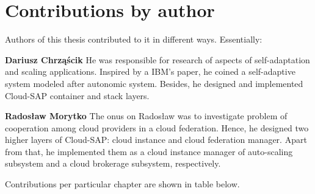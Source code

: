 \chapter{Contributions by author} 

Authors of this thesis contributed to it in different ways. Essentially: 

\begin{asparaenum}
 
 \item[\textbf{Dariusz Chrząścik}] He was responsible for research of aspects of self-adaptation and scaling applications. Inspired by a IBM's paper, he coined a self-adaptive system modeled after autonomic system. Besides, he designed and implemented Cloud-SAP container and stack layers.
 
 \item[\textbf{Radosław Morytko}] The onus on Radosław was to investigate problem of cooperation among cloud providers in a cloud federation. Hence, he designed two higher layers of Cloud-SAP: cloud instance and cloud federation manager. Apart from that, he implemented them as a cloud instance manager of auto-scaling subsystem and a cloud brokerage subsystem, respectively. 
 
\end{asparaenum}


Contributions per particular chapter are shown in table below.

